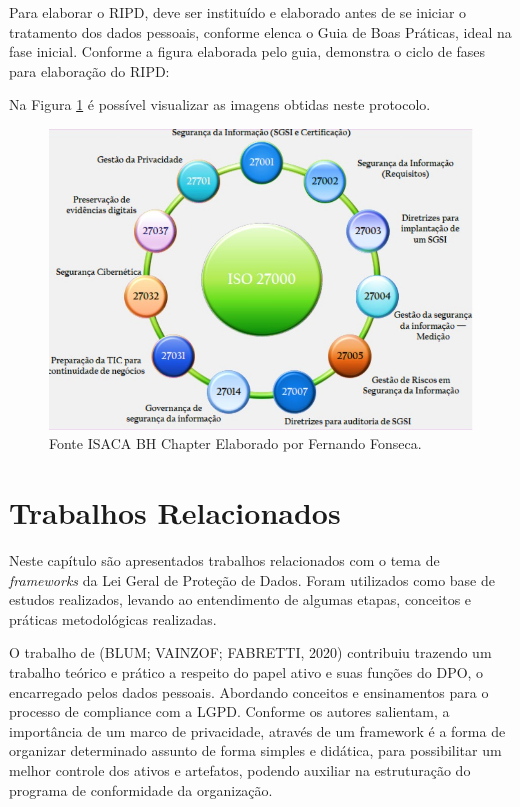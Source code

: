 \documentclass[
	12pt,				%
	openright,			%
	oneside,			%
	a4paper,			%
	english,			%
	french,				%
	spanish,			%
	brazil,				%
	]{abntex2}
\begin{document}
Para elaborar o RIPD, deve ser instituído e elaborado antes de se iniciar o tratamento dos dados pessoais, conforme elenca o Guia de Boas Práticas, ideal na fase inicial. Conforme a figura elaborada pelo guia, demonstra o ciclo de fases para elaboração do RIPD:

Na Figura \ref{fig: Iso } é possível visualizar as imagens obtidas neste protocolo.
\begin{figure}[ht]
    \centering
    \includegraphics[width=6.0in]{Images/03ISO.jpeg}
    \caption{Fonte ISACA BH Chapter Elaborado por Fernando Fonseca.}
    \label{fig: Iso }
\end{figure}



\chapter{Trabalhos Relacionados}
\label{ch: trabalhos relacionados}

Neste capítulo são apresentados trabalhos relacionados com o tema de \textit{frameworks} da Lei Geral de Proteção de Dados. Foram utilizados como base de estudos realizados, levando ao entendimento de algumas etapas, conceitos e práticas metodológicas realizadas.

O trabalho de (BLUM; VAINZOF; FABRETTI, 2020) contribuiu trazendo um trabalho teórico e prático a respeito do papel ativo e suas funções do DPO, o encarregado pelos dados pessoais. Abordando conceitos e ensinamentos para o processo de compliance com a LGPD. Conforme os autores salientam, a importância de um marco de privacidade, através de um framework é a forma de organizar determinado assunto de forma simples e didática, para possibilitar um melhor controle dos ativos e artefatos, podendo auxiliar na estruturação do programa de conformidade da organização.
\end{document}
